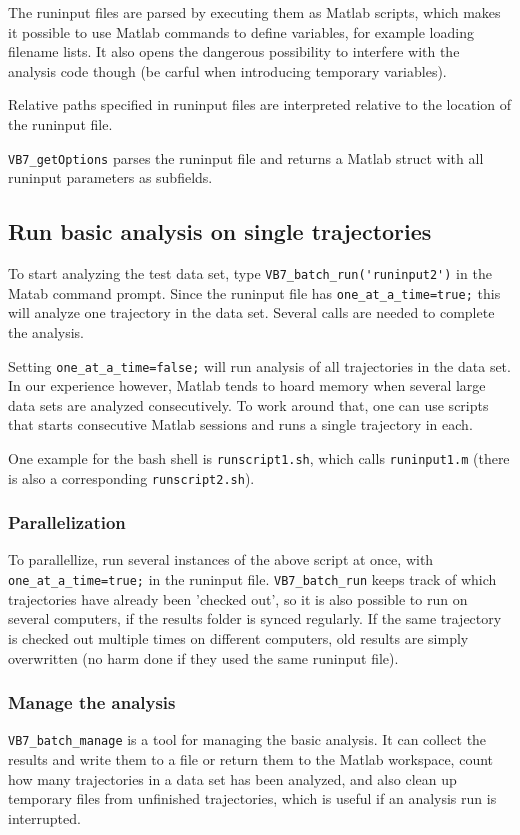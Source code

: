 The runinput files are parsed by executing them as Matlab scripts,
which makes it possible to use Matlab commands to define variables,
for example loading filename lists. It also opens the dangerous
possibility to interfere with the analysis code though (be carful when
introducing temporary variables).

Relative paths specified in runinput files are interpreted relative to
the location of the runinput file.

\texttt{VB7\_getOptions} parses the runinput file and returns a Matlab
struct with all runinput parameters as subfields.

\subsection{Run basic analysis on single trajectories}
To start analyzing the test data set, type
\verb+VB7_batch_run('runinput2')+ in the Matab command prompt. Since
the runinput file has \verb+one_at_a_time=true;+ this will analyze one
trajectory in the data set. Several calls are needed to complete the
analysis. 

Setting \verb+one_at_a_time=false;+ will run analysis of all
trajectories in the data set. In our experience however, Matlab tends
to hoard memory when several large data sets are analyzed
consecutively.  To work around that, one can use scripts that starts
consecutive Matlab sessions and runs a single trajectory in each.

One example for the bash shell is \verb+runscript1.sh+, which calls
\verb+runinput1.m+ (there is also a corresponding
\verb+runscript2.sh+).

\subsubsection*{Parallelization}
To parallellize, run several instances of the above script at once,
with \verb+one_at_a_time=true;+ in the runinput
file. \verb+VB7_batch_run+ keeps track of which trajectories have
already been 'checked out', so it is also possible to run on several
computers, if the results folder is synced regularly. If the same
trajectory is checked out multiple times on different computers, old
results are simply overwritten (no harm done if they used the same
runinput file).

\subsubsection*{Manage the analysis}
\verb+VB7_batch_manage+ is a tool for managing the basic analysis. It
can collect the results and write them to a file or return them to the
Matlab workspace, count how many trajectories in a data set has been
analyzed, and also clean up temporary files from unfinished
trajectories, which is useful if an analysis run is interrupted.

